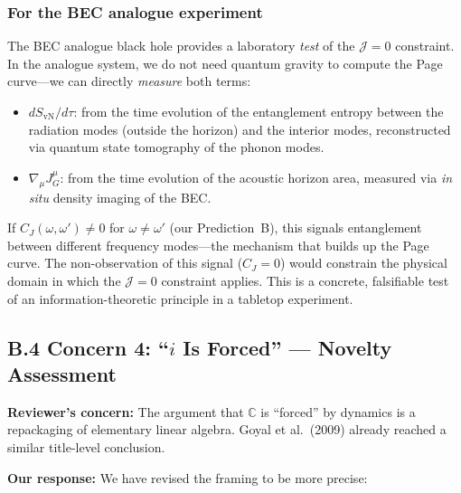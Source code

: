 \documentclass[11pt,a4paper]{article}
\begin{document}
\subsubsection*{For the BEC analogue experiment}

The BEC analogue black hole provides a laboratory \emph{test} of the $\mathcal{J}=0$ constraint. In the analogue system, we do not need quantum gravity to compute the Page curve---we can directly \emph{measure} both terms:
\begin{itemize}[leftmargin=*]
\item $dS_{\text{vN}}/d\tau$: from the time evolution of the entanglement entropy between the radiation modes (outside the horizon) and the interior modes, reconstructed via quantum state tomography of the phonon modes.
\item $\nabla_\mu J^\mu_G$: from the time evolution of the acoustic horizon area, measured via \emph{in situ} density imaging of the BEC.
\end{itemize}

If $C_J(\omega,\omega') \neq 0$ for $\omega \neq \omega'$ (our Prediction~B), this signals entanglement between different frequency modes---the mechanism that builds up the Page curve. The non-observation of this signal ($C_J=0$) would constrain the physical domain in which the $\mathcal{J}=0$ constraint applies. This is a concrete, falsifiable test of an information-theoretic principle in a tabletop experiment.

\subsection*{B.4 Concern 4: ``$i$ Is Forced'' --- Novelty Assessment}

\textbf{Reviewer's concern:} The argument that $\mathbb{C}$ is ``forced'' by dynamics is a repackaging of elementary linear algebra. Goyal et al.\ (2009) already reached a similar title-level conclusion.

\textbf{Our response:} We have revised the framing to be more precise:
\end{document}
